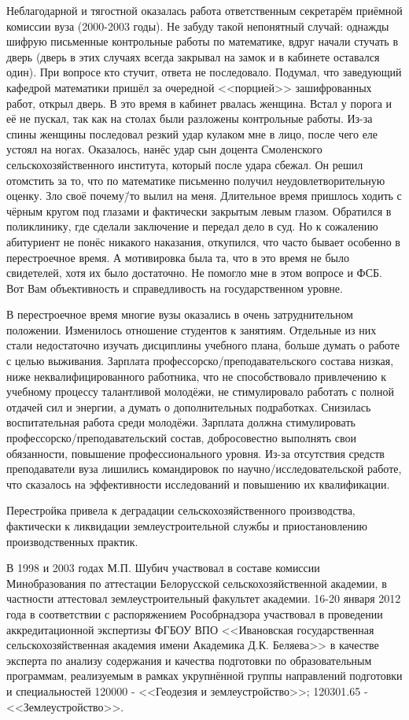 Неблагодарной и тягостной оказалась работа ответственным секретарём приёмной комиссии вуза (2000-2003 годы). Не забуду такой непонятный случай: однажды шифрую письменные контрольные работы по математике, вдруг начали стучать в дверь (дверь в этих случаях всегда закрывал на замок и в кабинете оставался один). При вопросе кто стучит, ответа не последовало. Подумал, что заведующий кафедрой математики пришёл за очередной <<порцией>> зашифрованных работ, открыл дверь. В это время в кабинет рвалась женщина. Встал у порога и её не пускал, так как на столах были разложены контрольные работы. Из-за спины женщины последовал резкий удар кулаком мне в лицо, после чего еле устоял на ногах. Оказалось, нанёс удар сын доцента Смоленского сельскохозяйственного института, который после удара сбежал. Он решил отомстить за то, что по математике письменно получил неудовлетворительную оценку. Зло своё почему\=/то вылил на меня. Длительное время пришлось ходить с чёрным кругом под глазами и фактически закрытым левым глазом. Обратился в поликлинику, где сделали заключение и передал дело в суд. Но к сожалению абитуриент не понёс никакого наказания, откупился, что часто бывает особенно в перестроечное время. А мотивировка была та, что в это время не было свидетелей, хотя их было достаточно. Не помогло мне в этом вопросе и ФСБ. Вот Вам объективность и справедливость на государственном уровне.

В перестроечное время многие вузы оказались в очень затруднительном положении. Изменилось отношение студентов к занятиям. Отдельные из них стали недостаточно изучать дисциплины учебного плана, больше думать о работе с целью выживания. Зарплата профессорско\-/преподавательского состава низкая, ниже неквалифицированного работника, что не способствовало привлечению к учебному процессу талантливой молодёжи, не стимулировало работать с полной отдачей сил и энергии, а думать о дополнительных подработках. Снизилась воспитательная работа среди молодёжи. Зарплата должна стимулировать профессорско\-/преподавательский состав, добросовестно выполнять свои обязанности, повышение профессионального уровня. Из-за отсутствия средств преподаватели вуза лишились командировок по научно\-/исследовательской работе, что сказалось на эффективности исследований и повышению их квалификации. 

Перестройка привела к деградации сельскохозяйственного производства, фактически к ликвидации землеустроительной службы и приостановлению производственных практик. 

В 1998 и 2003 годах М.П. Шубич участвовал в составе комиссии Минобразования по аттестации Белорусской сельскохозяйственной академии, в частности аттестовал землеустроительный факультет академии. 16-20 января 2012 года в соответствии с распоряжением Рособрнадзора участвовал в проведении аккредитационной экспертизы ФГБОУ ВПО <<Ивановская государственная сельскохозяйственная академия имени Академика Д.К. Беляева>> в качестве эксперта по анализу содержания и качества подготовки по образовательным программам, реализуемым в рамках укрупнённой группы направлений подготовки и специальностей 120000 - <<Геодезия и землеустройство>>; 120301.65 - <<Землеустройство>>.

